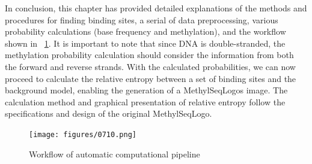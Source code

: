 \documentclass{PHlab-thesis}
\begin{document}
\begin{table}[H]
	\centering
	\caption{Detailed information about the WGBS files from the ENCODE}
	\label{table:WGBSinfo}
\end{table}
In conclusion, this chapter has provided detailed explanations of the methods and procedures for finding binding sites, a serial of data preprocessing, various probability calculations (base frequency and methylation), and the workflow shown in ~\ref{fig:Automatipipeline}. It is important to note that since DNA is double-stranded, the methylation probability calculation should consider the information from both the forward and reverse strands. With the calculated probabilities, we can now proceed to calculate the relative entropy between a set of binding sites and the background model, enabling the generation of a MethylSeqLogos image. The calculation method and graphical presentation of relative entropy follow the specifications and design of the original MethylSeqLogo.
\clearpage
\begin{figure}
	\centering
	\texttt{[image: figures/0710.png]}
	\caption{Workflow of automatic computational pipeline}
	\label{fig:Automatipipeline} 
\end{figure}
\end{document}
